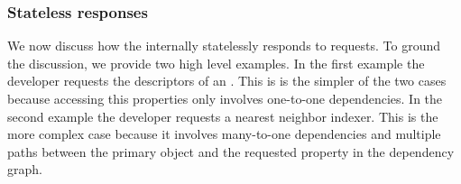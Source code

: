 


    \subsubsection{Stateless responses}

        We now discuss how the \depcache{} internally statelessly responds to
          requests.
        To ground the discussion, we provide two high level examples.
        In the first example the developer requests the descriptors of an
          \annot{}.
        This is is the simpler of the two cases because accessing this
          properties only involves one-to-one dependencies.
        In the second example the developer requests a nearest neighbor
          indexer.
        This is the more complex case because it involves many-to-one
          dependencies and multiple paths between the primary object and the
          requested property in the dependency graph.


